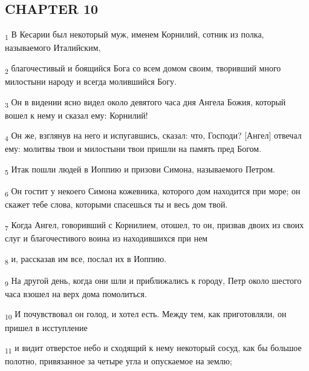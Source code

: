 \subsection{CHAPTER 10}
\begin{tcolorbox}
\textsubscript{1} В Кесарии был некоторый муж, именем Корнилий, сотник из полка, называемого Италийским,
\end{tcolorbox}
\begin{tcolorbox}
\textsubscript{2} благочестивый и боящийся Бога со всем домом своим, творивший много милостыни народу и всегда молившийся Богу.
\end{tcolorbox}
\begin{tcolorbox}
\textsubscript{3} Он в видении ясно видел около девятого часа дня Ангела Божия, который вошел к нему и сказал ему: Корнилий!
\end{tcolorbox}
\begin{tcolorbox}
\textsubscript{4} Он же, взглянув на него и испугавшись, сказал: что, Господи? [Ангел] отвечал ему: молитвы твои и милостыни твои пришли на память пред Богом.
\end{tcolorbox}
\begin{tcolorbox}
\textsubscript{5} Итак пошли людей в Иоппию и призови Симона, называемого Петром.
\end{tcolorbox}
\begin{tcolorbox}
\textsubscript{6} Он гостит у некоего Симона кожевника, которого дом находится при море; он скажет тебе слова, которыми спасешься ты и весь дом твой.
\end{tcolorbox}
\begin{tcolorbox}
\textsubscript{7} Когда Ангел, говоривший с Корнилием, отошел, то он, призвав двоих из своих слуг и благочестивого воина из находившихся при нем
\end{tcolorbox}
\begin{tcolorbox}
\textsubscript{8} и, рассказав им все, послал их в Иоппию.
\end{tcolorbox}
\begin{tcolorbox}
\textsubscript{9} На другой день, когда они шли и приближались к городу, Петр около шестого часа взошел на верх дома помолиться.
\end{tcolorbox}
\begin{tcolorbox}
\textsubscript{10} И почувствовал он голод, и хотел есть. Между тем, как приготовляли, он пришел в исступление
\end{tcolorbox}
\begin{tcolorbox}
\textsubscript{11} и видит отверстое небо и сходящий к нему некоторый сосуд, как бы большое полотно, привязанное за четыре угла и опускаемое на землю;
\end{tcolorbox}
